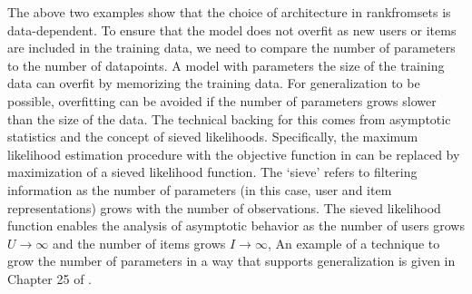 
The above two examples show that the choice of architecture in
\acrshort{rankfromsets} is data-dependent. To ensure that the model does not
overfit as new users or items are included in the training data, we need to
compare the number of parameters to the number of datapoints. A model with
parameters the size of the training data can overfit by memorizing the training
data. For generalization to be possible, overfitting can be avoided if the
number of parameters grows slower than the size of the data. The technical
backing for this comes from asymptotic statistics and the concept of sieved
likelihoods. Specifically, the maximum likelihood estimation procedure with the
objective function in  can be replaced by maximization of a
sieved likelihood function. The `sieve' refers to filtering information as the
number of parameters (in this case, user and item representations) grows with
the number of observations. The sieved likelihood function enables the analysis
of asymptotic behavior as the number of users grows $U\rightarrow \infty$ and
the number of items grows $I\rightarrow \infty$, An example of a technique to
grow the number of parameters in a way that supports generalization is given in
Chapter 25 of \citet{vaart_1998}.

